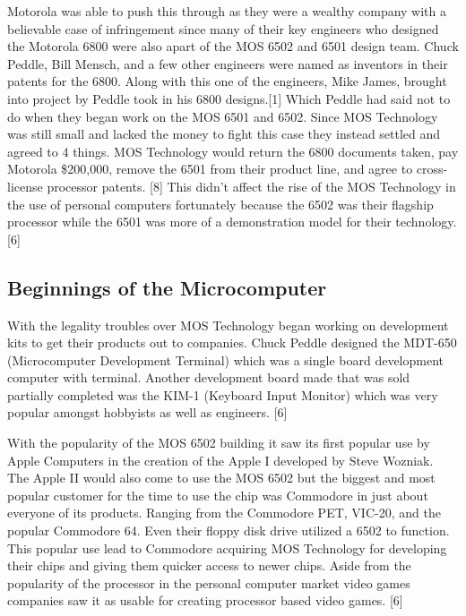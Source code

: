 \documentclass[journal]{IEEEtran}
\begin{document}
Motorola was able to push this through as they were a wealthy company with a believable case of infringement 
since many of their key engineers who designed the Motorola 6800 were also apart of the MOS 6502 and 6501 design
team.  Chuck Peddle, Bill Mensch, and a few other engineers were named as inventors in their patents for the
6800.  Along with this one of the engineers, Mike James, brought into project by Peddle took in his 6800
designs.[1]  Which Peddle had said not to do when they began work on the MOS 6501 and 6502.  Since MOS 
Technology was still small and lacked the money to fight this case they instead settled and agreed to 4
things.  MOS Technology would return the 6800 documents taken, pay Motorola \$200,000,  remove the 6501 from
their product line,  and agree to cross-license processor patents. [8]  This didn't affect the rise 
of the MOS Technology in the use of personal computers fortunately because the 6502 was their flagship processor 
while the 6501 was more of a demonstration model for their technology. [6]

\subsection{Beginnings of the Microcomputer}
With the legality troubles over MOS Technology began working on development kits to get their products out
to companies.  Chuck Peddle designed the MDT-650 (Microcomputer Development Terminal) which was a single 
board development computer with terminal. Another development board made that was sold partially completed 
was the KIM-1 (Keyboard Input Monitor) which was very popular amongst hobbyists as well as engineers. 
[6]

With the popularity of the MOS 6502 building it saw its first popular use by Apple Computers in the creation
of the Apple I developed by Steve Wozniak. The Apple II would also come to use the MOS 6502 but the biggest 
and most popular customer for the time to use the chip was Commodore in just about everyone of its products.  
Ranging from the Commodore PET, VIC-20, and the popular Commodore 64.  Even their floppy disk drive utilized 
a 6502 to function. This popular use lead to Commodore acquiring MOS Technology for developing their chips 
and giving them quicker access to newer chips.   Aside from the popularity of the processor in the personal 
computer market video games companies saw it as usable for creating processor based video games. [6]
\end{document}
